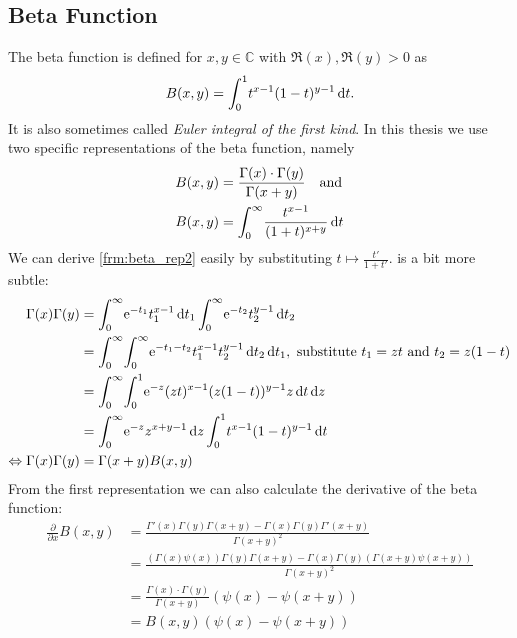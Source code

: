 \subsection{Beta Function}
\label{sec:beta_function}
The beta function is defined for $x,y\in\mathbb{C}$ with $\Re(x),\Re(y) > 0$ as
\begin{equation}
    B(x,y) = \Integ[1]{0}{t}{t^{x-1}(1-t)^{y-1}}.
    \label{def:beta}
\end{equation}
It is also sometimes called \textit{Euler integral of the first kind}. In this
thesis we use two specific representations of the beta function, namely
\begin{align}
    B(x, y) &= \frac{\Gamma(x)\cdot\Gamma(y)}{\Gamma(x+y)} \quad \text{and}
    \label{frm:beta_rep1} \\
    B(x, y) &= \Integ[\infty]{0}{t}{\frac{t^{x-1}}{(1 + t)^{x+y}}}
    \label{frm:beta_rep2}
\end{align}
We can derive \cref{frm:beta_rep2} easily by substituting $t \mapsto
\frac{t'}{1+t'}$.  is a bit more subtle:
\begin{align*}
    \Gamma(x) \Gamma(y) &= \Integ[\infty]{0}{t_1}{\Eto{-t_1}t_1^{x-1}}
                           \Integ[\infty]{0}{t_2}{\Eto{-t_2}t_2^{y-1}} \\
    &= \Integ[\infty]{0}{t_1}{
        \Integ[\infty]{0}{t_2}{
            \Eto{-t_1-t_2}t_1^{x-1}t_2^{y-1}
            }
        },\text{ substitute $t_1 = zt$ and $t_2 = z(1-t)$} \\
    &= \Integ[\infty]{0}{z}{
        \Integ[1]{0}{t}{
            \Eto{-z}(zt)^{x-1}(z(1-t))^{y-1}z
            }
        } \\
        &= \Integ[\infty]{0}{z}{ \Eto{-z}z^{x+y-1} }
            \Integ[1]{0}{t}{t^{x-1}(1-t)^{y-1}} \\
    \Leftrightarrow \Gamma(x)\Gamma(y) &= \Gamma(x+y)B(x,y)
\end{align*}
From the first representation we can also calculate the derivative of the beta
function:
\begin{align}
    \frac{\partial}{\partial x} B(x, y)
    &= \frac{
                \Gamma'(x)\Gamma(y)\Gamma(x+y) - \Gamma(x)\Gamma(y)\Gamma'(x+y) 
            }{
                \Gamma(x+y)^2
            } \nonumber \\
    &= \frac{
                (\Gamma(x)\psi(x))\Gamma(y)\Gamma(x+y) -
                \Gamma(x)\Gamma(y)(\Gamma(x+y)\psi(x+y))
            }{
                \Gamma(x+y)^2
            } \nonumber \\
    &= \frac{\Gamma(x)\cdot\Gamma(y)}{\Gamma(x+y)}\left(\psi(x) - \psi(x+y)\right)
        \nonumber \\
    &= B(x,y)\left(\psi(x) - \psi(x+y)\right)
    \label{frm:beta_deriv}
\end{align}
